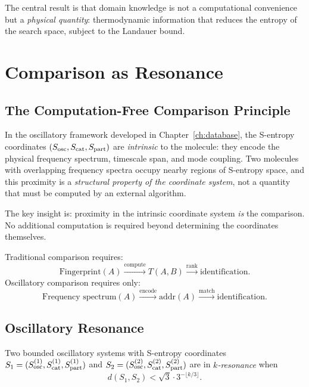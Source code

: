 The central result is that domain knowledge is not a computational convenience
but a \emph{physical quantity}: thermodynamic information that reduces the
entropy of the search space, subject to the Landauer bound.

\section{Comparison as Resonance}
\label{sec:ch24-resonance}

\subsection{The Computation-Free Comparison Principle}
\label{sec:ch24-comp-free}

In the oscillatory framework developed in Chapter~\ref{ch:database}, the
S-entropy coordinates $(S_{\mathrm{osc}}, S_{\mathrm{cat}}, S_{\mathrm{part}})$ are \emph{intrinsic} to the molecule:
they encode the physical frequency spectrum, timescale span, and mode coupling.
Two molecules with overlapping frequency spectra occupy nearby regions of
S-entropy space, and this proximity is a \emph{structural property of the
coordinate system}, not a quantity that must be computed by an external algorithm.

The key insight is: proximity in the intrinsic coordinate system \emph{is} the
comparison.  No additional computation is required beyond determining the
coordinates themselves.

Traditional comparison requires:
\[
  \text{Fingerprint}(A) \xrightarrow{\text{compute}} T(A,B)
  \xrightarrow{\text{rank}} \text{identification.}
\]
Oscillatory comparison requires only:
\[
  \text{Frequency spectrum}(A) \xrightarrow{\text{encode}}
  \mathrm{addr}(A) \xrightarrow{\text{match}} \text{identification.}
\]

\subsection{Oscillatory Resonance}
\label{sec:ch24-osc-resonance}

\begin{definition}
\label{def:ch24-resonance}
Two bounded oscillatory systems with S-entropy coordinates
$S_1 = (S_{\mathrm{osc}}^{(1)}, S_{\mathrm{cat}}^{(1)}, S_{\mathrm{part}}^{(1)})$ and
$S_2 = (S_{\mathrm{osc}}^{(2)}, S_{\mathrm{cat}}^{(2)}, S_{\mathrm{part}}^{(2)})$ are in \emph{$k$-resonance} when
\begin{equation}
\label{eq:ch24-resonance}
  d(S_1, S_2) < \sqrt{3} \cdot 3^{-\lfloor k/3 \rfloor}.
\end{equation}
\end{definition}

